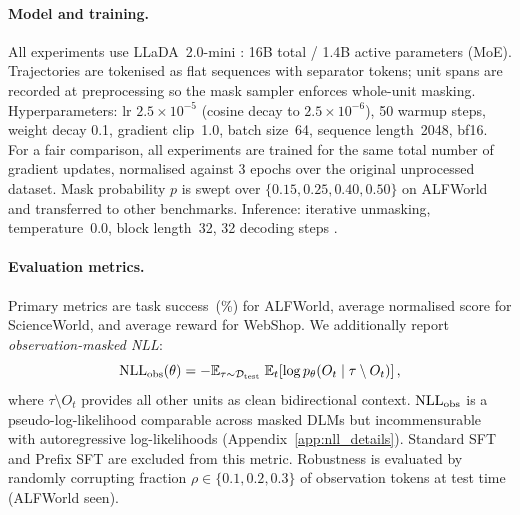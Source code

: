 \paragraph{Model and training.}
All experiments use LLaDA~2.0-mini \citep{bie2025llada20}: 16B total / 1.4B
active parameters (MoE). Trajectories are tokenised as flat sequences with
separator tokens; unit spans are recorded at preprocessing so the mask sampler
enforces whole-unit masking. Hyperparameters: lr $2.5\times10^{-5}$ (cosine
decay to $2.5\times10^{-6}$), 50 warmup steps, weight decay 0.1, gradient
clip~1.0, batch size~64, sequence length~2048, bf16. For a fair comparison, all
experiments are trained for the same total number of gradient updates,
normalised against 3 epochs over the original unprocessed dataset.
Mask probability $p$ is swept
over $\{0.15, 0.25, 0.40, 0.50\}$ on ALFWorld and transferred to other
benchmarks. Inference: iterative unmasking, temperature~0.0, block length~32,
32 decoding steps \citep{bie2025llada20}.

\paragraph{Evaluation metrics.}
Primary metrics are task success~(\%) for ALFWorld, average normalised score for
ScienceWorld, and average reward for WebShop. We additionally report
\emph{observation-masked NLL}:
\begin{equation}
  \mathrm{NLL}_{\text{obs}}(\theta) =
    -\mathbb{E}_{\tau \sim \mathcal{D}_{\text{test}}}\;
    \mathbb{E}_{t}\!\left[\log p_\theta(O_t \mid \tau \setminus O_t)\right],
  \label{eq:nll_obs}
\end{equation}
where $\tau \setminus O_t$ provides all other units as clean bidirectional
context. $\mathrm{NLL}_{\text{obs}}$ is a pseudo-log-likelihood
\citep{salazar2020masked} comparable across masked DLMs but incommensurable
with autoregressive log-likelihoods (Appendix~\ref{app:nll_details}).
Standard SFT and Prefix SFT are excluded from this metric.
Robustness is evaluated by randomly corrupting fraction
$\rho \in \{0.1, 0.2, 0.3\}$ of observation tokens at test time
(ALFWorld seen).
